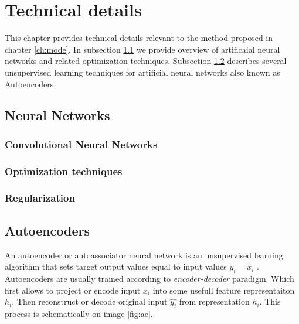 
\chapter{Technical details}
\label{ch:tede}

This chapter provides technical details relevant to the method proposed in chapter \ref{ch:mode}.
In subsection \ref{ch:nn} we provide overview of artificaial neural networks and related optimization techniques.
Subsection \ref{ch:ae} describes several unsupervised learning techniques for artificial neural networks also known as Autoencoders.

\section{Neural Networks}
\label{ch:nn}

\subsection{Convolutional Neural Networks}
\label{ch:cnn}

\subsection{Optimization techniques}
\subsection{Regularization}






\section{Autoencoders}\label{ch:ae}
An autoencoder or autoassociator neural network is an unsupervised learning algorithm that sets target output values equal to input values $y_i=x_i$ \cite{Ng2011,RanzatoMarcAurelio2007}.
Autoencoders are usually trained according to \textit{encoder-decoder} paradigm.
Which first allows to project or encode input $x_i$ into some usefull feature representaiton $h_i$.
Then reconstruct or decode original input $\hat{y_i}$ from representation $h_i$.
This process is schematically on image \ref{fig:ae}.

